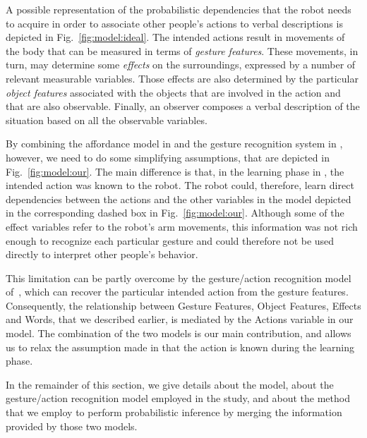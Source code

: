 A possible representation of the probabilistic dependencies that the robot needs to acquire in order to associate other people's actions to verbal descriptions is depicted in Fig.~\ref{fig:model:ideal}.
The intended actions result in movements of the body that can be measured in terms of \emph{gesture features}.
These movements, in turn, may determine some \emph{effects} on the surroundings, expressed by a number of relevant measurable variables.
Those effects are also determined by the particular \emph{object features} associated with the objects that are involved in the action and that are also observable.
Finally, an observer composes a verbal description of the situation based on all the observable variables.

By combining the affordance model in \cite{salvi:2012:smcb} and the gesture recognition system in \cite{saponaro:2013:crhri}, however, we need to do some simplifying assumptions, that are depicted in Fig.~\ref{fig:model:our}.
The main difference is that, in the learning phase in \cite{salvi:2012:smcb}, the intended action was known to the robot.
The robot could, therefore, learn direct dependencies between the actions and the other variables in the \affwords{} model depicted in the corresponding dashed box in Fig.~\ref{fig:model:our}.
Although some of the effect variables refer to the robot's arm movements, this information was not rich enough to recognize each particular gesture and could therefore not be used directly to interpret other people's behavior.

This limitation can be partly overcome by the gesture/action recognition model of~\cite{saponaro:2013:crhri}, which can recover the particular intended action from the gesture features.
Consequently, the relationship between Gesture Features, Object Features, Effects and Words, that we described earlier, is mediated by the Actions variable in our model.
The combination of the two models is our main contribution, and allows us to relax the assumption made in \cite{salvi:2012:smcb} that the action is known during the learning phase.

In the remainder of this section, we give details about the \affwords{} model, about the gesture/action recognition model employed in the study, and about the method that we employ to perform probabilistic inference by merging the information provided by those two models.



